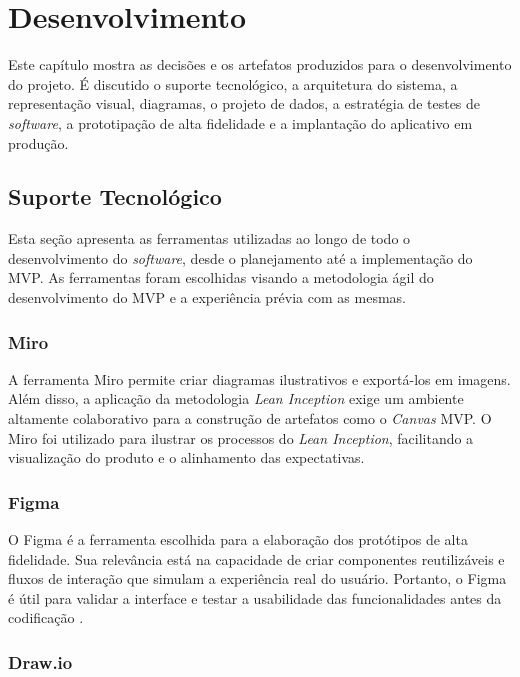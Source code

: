 \chapter{Desenvolvimento}

Este capítulo mostra as decisões e os artefatos produzidos para o desenvolvimento do projeto.
É discutido o suporte tecnológico, a arquitetura do sistema, a representação visual, diagramas, o projeto de dados, a estratégia de testes de \textit{software}, a prototipação de alta fidelidade e a implantação do aplicativo em produção.

\section{Suporte Tecnológico}

Esta seção apresenta as ferramentas utilizadas ao longo de todo o desenvolvimento do \textit{software}, desde o planejamento até a implementação do MVP.
As ferramentas foram escolhidas visando a metodologia ágil do desenvolvimento do MVP e a experiência prévia com as mesmas.

\subsection{Miro}

A ferramenta Miro permite criar diagramas ilustrativos e exportá-los em imagens.
Além disso, a aplicação da metodologia \textit{Lean Inception} exige um ambiente altamente colaborativo para a construção de artefatos como o \textit{Canvas} MVP.
O Miro foi utilizado para ilustrar os processos do \textit{Lean Inception}, facilitando a visualização do produto e o alinhamento das expectativas.

\subsection{Figma}

O Figma é a ferramenta escolhida para a elaboração dos protótipos de alta fidelidade.
Sua relevância está na capacidade de criar componentes reutilizáveis e fluxos de interação que simulam a experiência real do usuário.
Portanto, o Figma é útil para validar a interface e testar a usabilidade das funcionalidades antes da codificação \cite{figma_2025}.

\subsection{Draw.io}

